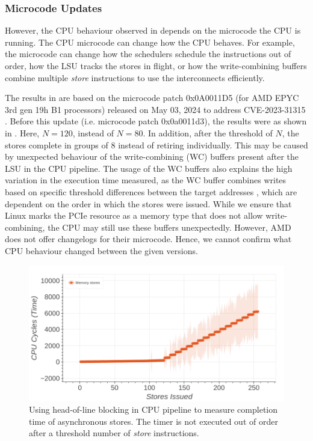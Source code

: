 \subsubsection{Microcode Updates}
\label{subsubsec:interconnect-sc-store-ops-challenges-microcode-updates}
However, the CPU behaviour observed in  depends on the microcode the CPU is running.
The CPU microcode can change how the CPU behaves.
For example, the microcode can change how the schedulers schedule the instructions out of order, how the LSU tracks the stores in flight, or how the write-combining buffers combine multiple \textit{store} instructions to use the interconnects efficiently.

The results in  are based on the microcode patch 0x0A0011D5 (for AMD EPYC 3rd gen 19h B1 processors) released on May 03, 2024 to address CVE-2023-31315 \cite{amd_microcode_update}.
Before this update (i.e. microcode patch 0x0a0011d3), the results were as shown in .
Here, $N = 120$, instead of $N = 80$. 
In addition, after the threshold of $N$, the stores complete in groups of $8$ instead of retiring individually.
This may be caused by unexpected behaviour of the write-combining (WC) buffers present after the LSU in the CPU pipeline.
The usage of the WC buffers also explains the high variation in the execution time measured, as the WC buffer combines writes based on specific threshold differences between the target addresses \cite{amd_7003_software_optimization_guide}, which are dependent on the order in which the stores were issued.
While we ensure that Linux marks the PCIe resource as a memory type that does not allow write-combining, the CPU may still use these buffers unexpectedly.
However, AMD does not offer changelogs for their microcode.
Hence, we cannot confirm what CPU behaviour changed between the given versions.


\begin{figure}[!htb]
    \centering
    \includegraphics[width=\columnwidth]{figures/interconnect-sc/store-ops/measuring_store_time_before_microcode_update.png}
    \caption{Using head-of-line blocking in CPU pipeline to measure completion time of asynchronous stores.
    The timer is not executed out of order after a threshold number of \textit{store} instructions.}
    \label{fig:measuring-store-time-before-microcode-update}
\end{figure}

